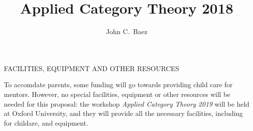 \documentclass[12pt]{amsart}
\begin{document}
\centerline{\large FACILITIES, EQUIPMENT AND OTHER RESOURCES}
\title{Applied Category Theory 2018}
\author{John C.\ Baez}

\maketitle


To accomdate parents, some funding will go towards providing child
care for mentors.  However, no special facilities, equipment or other
resources will be needed for this proposal: the workshop
\textsl{Applied Category Theory 2019} will be held at Oxford
University, and they will provide all the necessary facilities,
including for childare, and equipment.
\end{document}
